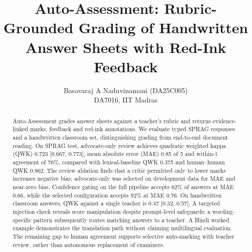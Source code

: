 \documentclass[10pt,a4paper]{article}
\title{Auto-Assessment: Rubric-Grounded Grading of Handwritten Answer Sheets with Red-Ink Feedback}
\author{Basavaraj A Naduvinamani (DA25C005)\\DA7016, IIT Madras}
\date{}
\begin{document}
\maketitle
\begin{abstract}
Auto-Assessment grades answer sheets against a teacher's rubric and returns evidence-linked marks, feedback and red-ink annotations. We evaluate typed SPRAG responses and a handwritten classroom set, distinguishing grading from end-to-end document reading. On SPRAG test, advocate-only review achieves quadratic weighted kappa (QWK) 0.723 [0.667, 0.773], mean absolute error (MAE) 0.85 of 5 and within-1 agreement of 76\%, compared with lexical-baseline QWK 0.375 and human--human QWK 0.962. The review ablation finds that a critic permitted only to lower marks increases negative bias; advocate-only was selected on development data for MAE and near-zero bias. Confidence gating on the full pipeline accepts 62\% of answers at MAE 0.66, while the selected configuration accepts 92\% at MAE 0.76. On handwritten classroom answers, QWK against a single teacher is 0.47 [0.32, 0.57]. A targeted injection check reveals score manipulation despite prompt-level safeguards; a wording-specific pattern subsequently routes matching answers to a teacher. A Hindi worked example demonstrates the translation path without claiming multilingual evaluation. The remaining gap to human agreement supports selective auto-marking with teacher review, rather than autonomous replacement of examiners.
\end{abstract}








\clearpage


\clearpage
\appendix

\end{document}
